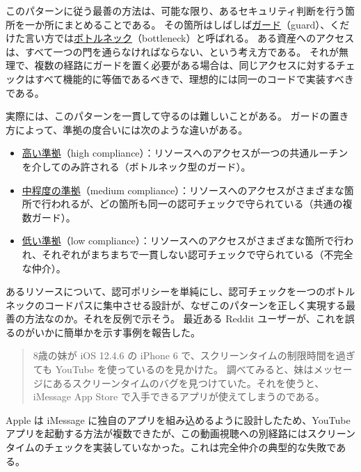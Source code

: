 \documentclass[uplatex]{jsarticle}
\def\label#1{}%
\begin{document}
このパターンに従う最善の方法は、可能な限り、あるセキュリティ判断を行う箇所を一か所にまとめることである。
その箇所はしばしば\underline{ガード}（guard）、くだけた言い方では\underline{ボトルネック}（bottleneck）と呼ばれる。
ある資産へのアクセスは、すべて一つの門を通らなければならない、という考え方である。
それが無理で、複数の経路にガードを置く必要がある場合は、同じアクセスに対するチェックはすべて機能的に等価であるべきで、理想的には同一のコードで実装すべきである。

実際には、このパターンを一貫して守るのは難しいことがある。
ガードの置き方によって、準拠の度合いには次のような違いがある。

\begin{dfn}[完全仲介への準拠の度合い]\label{dfn:ch4-mediation-compliance}
\begin{itemize}
\item \underline{高い準拠}（high compliance）：リソースへのアクセスが一つの共通ルーチンを介してのみ許される（ボトルネック型のガード）。
\item \underline{中程度の準拠}（medium compliance）：リソースへのアクセスがさまざまな箇所で行われるが、どの箇所も同一の認可チェックで守られている（共通の複数ガード）。
\item \underline{低い準拠}（low compliance）：リソースへのアクセスがさまざまな箇所で行われ、それぞれがまちまちで一貫しない認可チェックで守られている（不完全な仲介）。
\end{itemize}
\end{dfn}

あるリソースについて、認可ポリシーを単純にし、認可チェックを一つのボトルネックのコードパスに集中させる設計が、なぜこのパターンを正しく実現する最善の方法なのか。それを反例で示そう。
最近ある Reddit ユーザーが、これを誤るのがいかに簡単かを示す事例を報告した。

\begin{exa}\label{exa:ch4-screen-time}
\begin{quote}
8歳の妹が iOS 12.4.6 の iPhone 6 で、スクリーンタイムの制限時間を過ぎても YouTube を使っているのを見かけた。
調べてみると、妹はメッセージにあるスクリーンタイムのバグを見つけていた。それを使うと、iMessage App Store で入手できるアプリが使えてしまうのである。
\end{quote}
Apple は iMessage に独自のアプリを組み込めるように設計したため、YouTube アプリを起動する方法が複数できたが、この動画視聴への別経路にはスクリーンタイムのチェックを実装していなかった。これは完全仲介の典型的な失敗である。
\end{exa}
\end{document}
